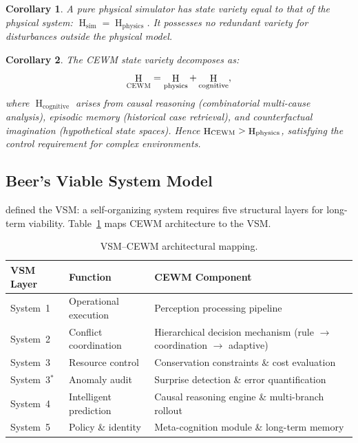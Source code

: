 \documentclass[11pt,a4paper]{article}
\newtheorem{corollary}{Corollary}[theorem]
\newcommand{\CEWM}{\textsc{CEWM}}
\newcommand{\VSM}{\textsc{VSM}}
\DeclareMathOperator{\Ent}{H}
\begin{document}
\begin{corollary}\label{cor:sim}
A pure physical simulator has state variety equal to that of the physical system: $\Ent_{\mathrm{sim}} = \Ent_{\mathrm{physics}}$. It possesses no \emph{redundant variety} for disturbances outside the physical model.
\end{corollary}

\begin{corollary}\label{cor:cewm}
The \CEWM{} state variety decomposes as:
\begin{equation}\label{eq:cewm-variety}
  \Ent_{\CEWM} = \Ent_{\mathrm{physics}} + \Ent_{\mathrm{cognitive}},
\end{equation}
where $\Ent_{\mathrm{cognitive}}$ arises from causal reasoning (combinatorial multi-cause analysis), episodic memory (historical case retrieval), and counterfactual imagination (hypothetical state spaces). Hence $\Ent_{\CEWM} > \Ent_{\mathrm{physics}}$, satisfying the control requirement for complex environments.
\end{corollary}

\subsection{Beer's Viable System Model}

\citet{beer1979heart,beer1985diagnosing} defined the \VSM{}: a self-organizing system requires five structural layers for long-term viability. Table~\ref{tab:vsm} maps \CEWM{} architecture to the \VSM{}.

\begin{table}[H]
\centering
\caption{\VSM{}--\CEWM{} architectural mapping.}\label{tab:vsm}
\small
\begin{tabularx}{\textwidth}{llX}
\toprule
\textbf{VSM Layer} & \textbf{Function} & \textbf{\CEWM{} Component} \\
\midrule
System~1 & Operational execution & Perception processing pipeline \\
System~2 & Conflict coordination  & Hierarchical decision mechanism (rule $\to$ coordination $\to$ adaptive) \\
System~3 & Resource control      & Conservation constraints \& cost evaluation \\
System~3$^*$ & Anomaly audit      & Surprise detection \& error quantification \\
System~4 & Intelligent prediction & Causal reasoning engine \& multi-branch rollout \\
System~5 & Policy \& identity    & Meta-cognition module \& long-term memory \\
\bottomrule
\end{tabularx}
\end{table}
\end{document}
